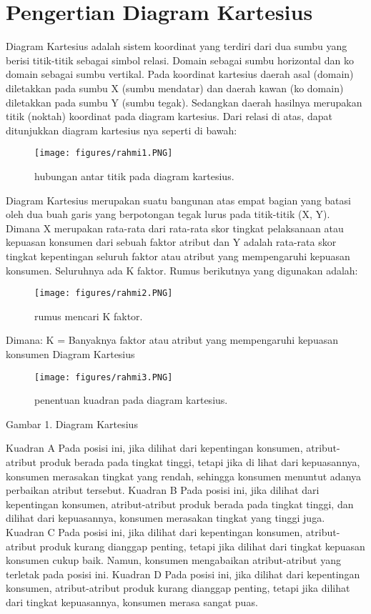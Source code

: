 
\section{Pengertian Diagram Kartesius}
Diagram Kartesius adalah sistem koordinat yang terdiri dari dua sumbu yang berisi titik-titik sebagai simbol relasi.
Domain sebagai sumbu horizontal dan ko domain sebagai sumbu vertikal.
Pada koordinat kartesius daerah asal (domain) diletakkan pada sumbu X (sumbu mendatar) dan daerah kawan (ko domain) diletakkan pada sumbu Y (sumbu tegak).
Sedangkan daerah hasilnya merupakan titik (noktah) koordinat pada diagram kartesius. Dari relasi di atas, dapat ditunjukkan diagram kartesius nya seperti di bawah:
\begin{figure}[ht]
	\centerline{\texttt{[image: figures/rahmi1.PNG]}}
	\caption{hubungan antar titik pada diagram kartesius.}
	\label{rahmi1}
	\end{figure}

Diagram Kartesius merupakan suatu bangunan atas empat bagian yang batasi oleh dua buah garis yang berpotongan tegak lurus pada titik-titik (X, Y). 
Dimana X merupakan rata-rata dari rata-rata skor tingkat pelaksanaan atau kepuasan konsumen dari sebuah faktor atribut 
dan Y adalah rata-rata skor tingkat kepentingan seluruh faktor atau atribut yang mempengaruhi kepuasan konsumen.
Seluruhnya ada K faktor. Rumus berikutnya yang digunakan adalah:
\begin{figure}[ht]
	\centerline{\texttt{[image: figures/rahmi2.PNG]}}
	\caption{rumus mencari K faktor.}
	\label{rahmi2}
	\end{figure}

Dimana: K = Banyaknya faktor atau atribut yang mempengaruhi kepuasan konsumen 
Diagram Kartesius	
\begin{figure}[ht]
	\centerline{\texttt{[image: figures/rahmi3.PNG]}}
	\caption{penentuan kuadran pada diagram kartesius.}
	\label{rahmi3}
	\end{figure}

Gambar 1. Diagram Kartesius



Kuadran A
Pada posisi ini, jika dilihat dari kepentingan konsumen, atribut-atribut produk berada pada tingkat tinggi, tetapi jika di lihat dari kepuasannya, 
konsumen merasakan tingkat yang rendah, sehingga konsumen menuntut adanya perbaikan atribut tersebut.
Kuadran B
Pada posisi ini, jika dilihat dari kepentingan konsumen, atribut-atribut produk berada pada tingkat tinggi, dan dilihat dari kepuasannya, 
konsumen merasakan tingkat yang tinggi juga.
Kuadran C
Pada posisi ini, jika dilihat dari kepentingan konsumen, atribut-atribut produk kurang dianggap penting, tetapi jika dilihat dari tingkat kepuasan konsumen cukup baik.
Namun, konsumen mengabaikan atribut-atribut yang terletak pada posisi ini.
Kuadran D
Pada posisi ini, jika dilihat dari kepentingan konsumen, atribut-atribut produk kurang dianggap penting, tetapi jika dilihat dari tingkat kepuasannya, konsumen merasa
sangat puas.


